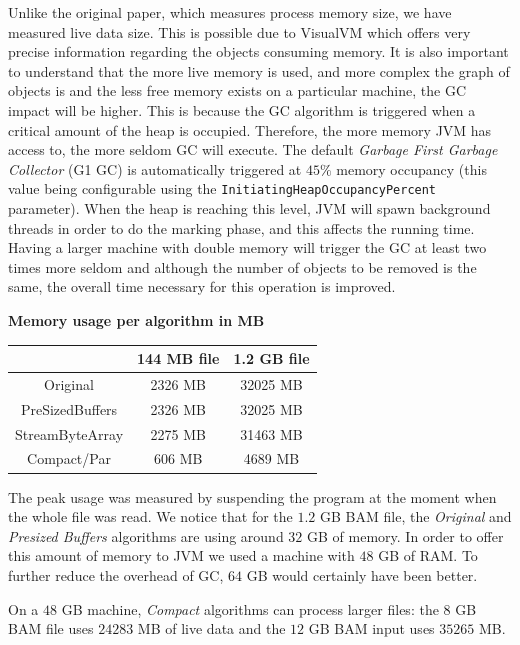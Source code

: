 \documentclass[a4paper,twoside]{article}
\begin{document}
{Unlike the original paper, which measures process memory size, we have measured live data size.
This is possible due to VisualVM which offers very precise information regarding the objects consuming memory.
It is also important to understand that the more live memory is used, and more complex the graph of objects is and the less free memory exists on a particular machine, the GC impact will be higher.
This is because the GC algorithm is triggered when a critical amount of the heap is occupied.
Therefore, the more memory JVM has access to, the more seldom GC will execute.
The default {\textit{Garbage First Garbage Collector}  (G1 GC)} is automatically triggered at $45\%$ memory occupancy (this value being configurable using the \texttt{InitiatingHeapOccupancyPercent} parameter). When the heap is reaching this level, JVM will spawn background threads in order to do the marking phase, and this affects the running time.
Having a larger machine with double memory will trigger the GC at least two times more seldom and
although the number of objects to be removed is the same, the overall time necessary for this operation is improved.

\begin{small}
\begin{center}
\textbf{Memory usage per algorithm in MB} \\
	\begin{tabular}{|c|c|c|}
		\hline			  	& 144 MB file		& 1.2 GB file		\\ \hline
		Original			& 2326 MB			& 32025 MB			\\ \hline
		PreSizedBuffers		& 2326 MB			& 32025 MB			\\ \hline
		StreamByteArray 	& 2275 MB			& 31463 MB			\\ \hline
		Compact/Par			& 606 MB			& 4689 MB			\\ \hline
	\end{tabular}
\end{center}
\end{small}

The peak usage was measured by suspending the program at the moment when the whole file was read.
We notice that for the $1.2$ GB BAM file, the {\textit{Original} } and {\textit{Presized Buffers} } algorithms are using around $32$ GB of memory. In order to offer this amount of memory to JVM we used a machine with $48$ GB of RAM. To further reduce the overhead of GC, $64$ GB would certainly have been better.

On a $48$ GB machine, {\textit{Compact} } algorithms can process larger files: the $8$ GB BAM file uses $24283$ MB of live data and the $12$ GB BAM input uses $35 265$ MB.


}
\end{document}
